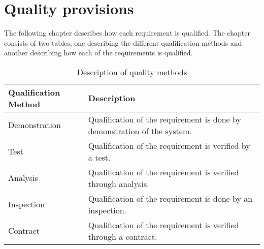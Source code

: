 \chapter{Quality provisions}
The following chapter describes how each requirement is qualified. The chapter consists of two tables, one describing the different qualification methods and another describing how each of the requirements is qualified.\\



\begin{table}[H]
\begin{tabular}{|l|l|}
\hline
 \textbf{Qualification Method} & \textbf{Description} \\ \hline
 Demonstration & Qualification of the requirement is done by demonstration of the system. \\  \hline
 Test & Qualification of the requirement is verified by a test. \\  \hline
 Analysis & Qualification of the requirement is verified through analysis.  \\  \hline %
 Inspection & Qualification of the requirement is done by an inspection.  \\  \hline %
 Contract & Qualification of the requirement is verified through a contract. \\ \hline
\end{tabular}
\caption{Description of quality methods}
\end{table}


\enspace


